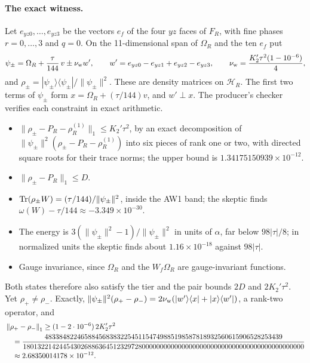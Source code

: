 \paragraph{The exact witness.}
Let $e_{yz0},\ldots,e_{yz3}$ be the vectors $e_f$ of the four $yz$ faces of
$F_R$, with fine phases $r=0,\dots,3$ and $q=0$. On the 11-dimensional span
of $\Omega_R$ and the ten $e_f$ put
\begin{equation}
 \psi_\pm=\Omega_R+\frac\tau{144}\,v\pm\nu_{\rm w}w',\qquad
 w'=e_{yz0}-e_{yz1}+e_{yz2}-e_{yz3},\qquad
 \nu_{\rm w}=\frac{K_2'\tau^2(1-10^{-6})}4,
 \label{eq:ay2-witness}
\end{equation}
and $\rho_\pm=|\psi_\pm\rangle\langle\psi_\pm|/\lVert \psi_\pm\rVert^2$. These are
density matrices on $\mathcal H_R$. The first two terms of $\psi_\pm$ form
$x=\Omega_R+(\tau/144)v$, and $w'\perp x$. The producer's checker verifies each constraint in exact
arithmetic.
\begin{itemize}
\item $\lVert \rho_\pm-P_R-\rho^{(1)}_R\rVert_1\le K_2'\tau^2$, by an exact
 decomposition of $\lVert \psi_\pm\rVert^2(\rho_\pm-P_R-\rho^{(1)}_R)$ into six
 pieces of rank one or two, with directed square roots for their trace norms;
 the upper bound is $1.34175150939\times10^{-12}$.
\item $\lVert \rho_\pm-P_R\rVert_1\le D$.
\item $\operatorname{Tr}(\rho_\pm W)=(\tau/144)/\lVert \psi_\pm\rVert^2$, inside the AW1 band; the
 skeptic finds $\omega(W)-\tau/144\approx-3.349\times10^{-30}$.
\item The energy is $3(\lVert \psi_\pm\rVert^2-1)/\lVert \psi_\pm\rVert^2$ in units of
 $\alpha$, far below $98|\tau|/8$; in normalized units the skeptic finds
 about $1.16\times10^{-18}$ against $98|\tau|$.
\item Gauge invariance, since $\Omega_R$ and the $W_f\Omega_R$ are
 gauge-invariant functions.
\end{itemize}
Both states therefore also satisfy the tier and the pair bounds $2D$ and
$2K_2'\tau^2$. Yet $\rho_+\ne\rho_-$. Exactly,
$\lVert \psi_\pm\rVert^2(\rho_+-\rho_-)=2\nu_{\rm w}(|w'\rangle\langle
x|+|x\rangle\langle w'|)$, a rank-two operator, and
\[
 \begin{aligned}
 &\left\lVert\rho_+-\rho_-\right\rVert_1\ge(1-2\cdot10^{-6})\,2K_2'\tau^2\\
 &\quad=\frac{483384822465884568383225451154749885198587818932560615906528253439}{180132214244543026886364512329728000000000000000000000000000000000000000000000}\\
 &\quad\approx2.68350014178\times10^{-12}.
 \end{aligned}
\]
